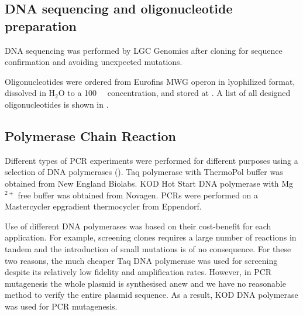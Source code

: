     \subsection{DNA sequencing and oligonucleotide preparation}
      DNA sequencing was performed by LGC Genomics after cloning for sequence
      confirmation and avoiding unexpected mutations.

      Oligonucleotides were ordered from Eurofins MWG operon in lyophilized
      format, dissolved in H$_2$O to a \SI{100}{\micro\Molar} concentration,
      and stored at . A list of all designed oligonucleotides is
      shown in .

    \subsection{Polymerase Chain Reaction}
      Different types of PCR experiments were performed for different purposes
      using a selection of DNA polymerases ().
      Taq polymerase with ThermoPol
      buffer was obtained from New England Biolabs.
      KOD Hot Start DNA polymerase with Mg$^{2+}$
      free buffer was obtained from Novagen. PCRs were performed on a
      Mastercycler epgradient thermocycler from Eppendorf.

      Use of different DNA polymerases was based on their cost-benefit for
      each application. For example, screening clones requires a large number
      of reactions in tandem and the introduction of small mutations
      is of no consequence. For these two reasons, the much cheaper Taq DNA
      polymerase was used for screening despite its relatively low fidelity and
      amplification rates. However, in PCR mutagenesis the whole plasmid
      is synthesised anew and we have no reasonable method to verify
      the entire plasmid
      sequence. As a result, KOD DNA polymerase was used for PCR mutagenesis.

